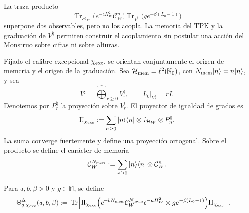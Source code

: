 La traza producto
\[
 \operatorname{Tr}_{\mathcal H_W}
 \bigl(e^{-aH_W^2}\mathcal C_W^n\bigr)
 \operatorname{Tr}_{V^\natural}
 \bigl(g e^{-\beta(L_0-1)}\bigr)
\]
superpone dos observables, pero no los acopla. La memoria del TPK y la
graduación de \(V^\natural\) permiten construir el acoplamiento sin postular
una acción del Monstruo sobre cifras ni sobre alturas.

Fijado el calibre excepcional \(\chi_{\rm exc}\), se orientan conjuntamente
el origen de memoria y el origen de la graduación. Sea
\(\mathcal H_{\rm mem}=\ell^2(\mathbb N_0)\), con
\(N_{\rm mem}|n\rangle=n|n\rangle\), y sea
\[
 V^\natural=\widehat\bigoplus_{r\ge0}V^\natural_r,
 \qquad L_0|_{V^\natural_r}=rI.
\]
Denotemos por \(P_r^\natural\) la proyección sobre
\(V^\natural_r\). El proyector de igualdad de grados es
\begin{equation}
 \Pi_{\chi_{\rm exc}}
 :=\sum_{n\ge0}|n\rangle\langle n|
 \otimes I_{\mathcal H_W}\otimes P_n^\natural.
 \label{eq:cpe-proyector-diagonal-grados}
\end{equation}
La suma converge fuertemente y define una proyección ortogonal. Sobre el
producto se define el carácter de memoria
\begin{equation}
 \mathcal C_W^{N_{\rm mem}}
 :=\sum_{n\ge0}|n\rangle\langle n|
 \otimes\mathcal C_W^n.
 \label{eq:cpe-cayley-memoria}
\end{equation}

\begin{definition}
\label{def:cpe-traza-diagonal}
Para \(a,b,\beta>0\) y \(g\in\mathbb M\), se define
\begin{equation}
\begin{aligned}
 \Theta^{\Delta}_{g,\chi_{\rm exc}}(a,b,\beta)
 :={}&\operatorname{Tr}\!\left[
 \Pi_{\chi_{\rm exc}}
 \Bigl(
 e^{-bN_{\rm mem}}
 \mathcal C_W^{N_{\rm mem}}e^{-aH_W^2}
 \otimes g e^{-\beta(L_0-1)}
 \Bigr)
 \Pi_{\chi_{\rm exc}}
 \right].
 \label{eq:cpe-traza-diagonal-def}
\end{aligned}
\end{equation}
\end{definition}

